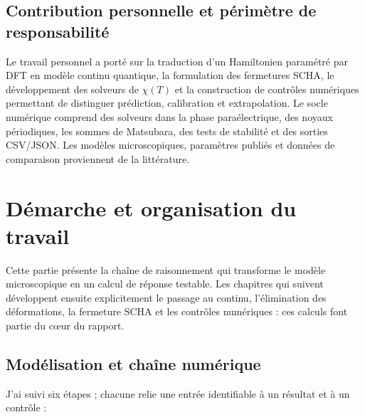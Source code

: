 \documentclass{rapportCS}
\begin{document}
\subsection{Contribution personnelle et périmètre de responsabilité}

Le travail personnel a porté sur la traduction d'un Hamiltonien paramétré par
DFT en modèle continu quantique, la formulation des fermetures SCHA, le
développement des solveurs de $\chi(T)$ et la construction de contrôles
numériques permettant de distinguer prédiction, calibration et extrapolation.
Le socle numérique comprend des solveurs dans la phase paraélectrique, des
noyaux périodiques, les sommes de Matsubara, des tests de stabilité et des
sorties CSV/JSON. Les modèles microscopiques, paramètres publiés et données de
comparaison proviennent de la littérature.

\section{Démarche et organisation du travail}
\label{sec:euartingineering_approach}

Cette partie présente la chaîne de raisonnement qui transforme le modèle
microscopique en un calcul de réponse testable. Les chapitres qui suivent
développent ensuite explicitement le passage au continu, l'élimination des
déformations, la fermeture SCHA et les contrôles numériques : ces calculs font
partie du cœur du rapport.

\subsection{Modélisation et chaîne numérique}

J'ai suivi six étapes ; chacune relie une entrée identifiable à un résultat et
à un contrôle :
\end{document}
